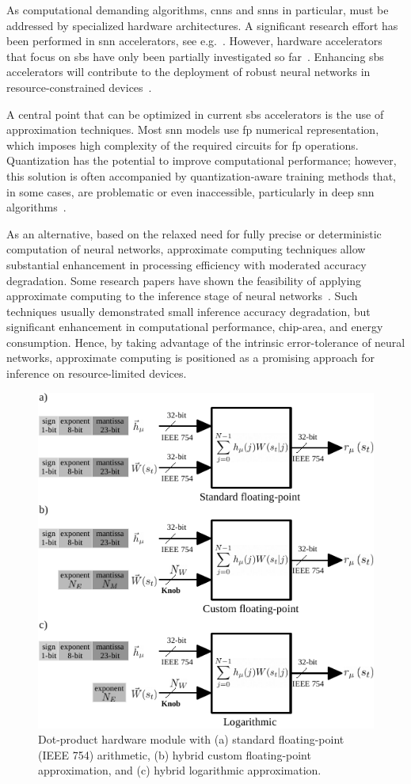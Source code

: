 As computational demanding algorithms, \glspl{cnn} and \glspl{snn} in particular, must be addressed by specialized hardware architectures. A significant research effort has been performed in \gls{snn} accelerators, see e.g.~\cite{roy2019towards,bouvier2019spiking, young2019review,TrueNorth_Trans15,Spinnaker_Trans13,davies2018loihi}.
  However, hardware accelerators that focus on \gls{sbs} have only been partially investigated so far~\cite{rotermund2018massively}.
  Enhancing \gls{sbs} accelerators will contribute to the deployment of robust neural networks in resource-constrained devices~\cite{nevarez2020accelerator,ernst2007efficient,rotermund2019recurrentsbs, dayan2001theoretical}.

A central point that can be optimized in current \gls{sbs} accelerators
is the use of approximation techniques.
Most \gls{snn} models use \gls{fp}  numerical representation, which imposes high complexity of the required circuits for \gls{fp} operations. Quantization has the potential to improve computational performance; however, this solution is often accompanied by quantization-aware training methods that, in some cases, are problematic or even inaccessible, particularly in deep \gls{snn} algorithms~\cite{zhang2018survey}.

As an alternative, based on the relaxed need for fully precise or deterministic computation of neural networks, approximate computing techniques allow substantial enhancement in processing efficiency with moderated accuracy degradation. Some research papers have shown the feasibility of applying approximate computing to the inference stage of neural networks~\cite{lotrivc2012applicability, sarwar2016multiplier, mrazek2016design, du2014leveraging}. Such techniques usually demonstrated small inference accuracy degradation, but significant enhancement in computational performance, chip-area, and energy consumption. Hence, by taking advantage of the intrinsic error-tolerance of neural networks, approximate computing is positioned as a promising approach for inference on resource-limited devices.

\begin{figure}[b!]
	\centering
	\includegraphics[width=0.5\columnwidth]{./chapters/sbs_accelerator/figures/dot-product_unit.pdf}
	\caption{Dot-product hardware module with (a) standard floating-point (IEEE 754) arithmetic, (b) hybrid custom floating-point approximation, and (c) hybrid logarithmic approximation.}
	\label{fig:dot_product_unit}
\end{figure}

